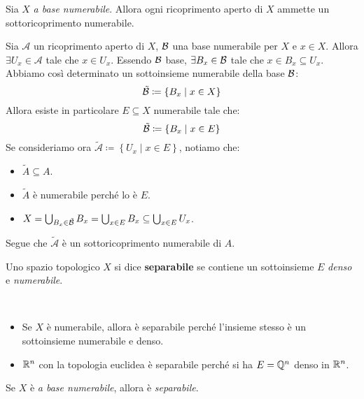 \begin{proposition}
Sia $X$ \textit{a base numerabile}. Allora ogni ricoprimento aperto di $X$ ammette un sottoricoprimento numerabile.
\end{proposition}
\begin{demonstration}
Sia $\mathcal{A}$ un ricoprimento aperto di $X$, $\mathcal{B}$ una base numerabile per $X$ e $x\in X$. Allora $\exists U_x\in\mathcal{A}$ tale che $x\in U_x$. Essendo $\mathcal{B}$ base, $\exists B_x\in\mathcal{B}$ tale che $x\in B_x\subseteq U_x$.\\
Abbiamo così determinato un sottoinsieme numerabile della base $\mathcal{B}$:
\begin{equation*}
\tilde{\mathcal{B}}\coloneqq\left\{B_x\mid x\in X\right\}
\end{equation*}
Allora esiste in particolare $E\subseteq X$ numerabile tale che:
\begin{equation*}
\tilde{\mathcal{B}}\coloneqq\left\{B_x\mid x\in E\right\}
\end{equation*}
Se consideriamo ora $\tilde{\mathcal{A}}\coloneqq\left\{U_x\mid x\in E\right\}$, notiamo che:
\begin{itemize}
	\item $\tilde{A}\subseteq A$.
	\item $\tilde{A}$ è numerabile perché lo è $E$.
	\item $X=\mathop{{\bigcup}}\displaylimits_{B_x\in\tilde{\mathcal{B}}}B_x=\mathop{{\bigcup}}\displaylimits_{x\in E}B_x\subseteq \mathop{{\bigcup}}\displaylimits_{x\in E}U_x $.
\end{itemize}
Segue che $\tilde{\mathcal{A}}$ è un sottoricoprimento numerabile di $A$.
\end{demonstration}
\begin{define}
Uno spazio topologico $X$ si dice \textbf{separabile} se contiene un sottoinsieme $E$ \textit{denso} e \textit{numerabile}.
\end{define}
\begin{examples}~{}
	\begin{itemize}
		\item Se $X$ è numerabile, allora è separabile perché l'insieme stesso è un sottoinsieme numerabile e denso.
		\item $\mathbb{R}^n$ con la topologia euclidea è separabile perché si ha $E=\mathbb{Q}^n$ denso in $\mathbb{R}^n$.
	\end{itemize}
\end{examples}
\begin{lemming}\label{basenumseparabile}
Se $X$ è \textit{a base numerabile}, allora è \textit{separabile}.
\end{lemming}
